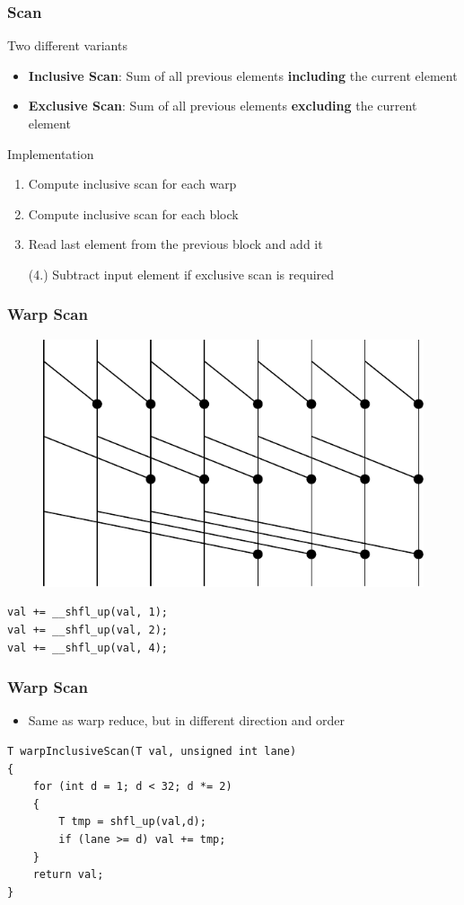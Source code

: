 \documentclass[aspectratio=169,handout]{beamer}
\begin{document}
\begin{frame}[fragile]
\frametitle{Scan}
Two different variants
\begin{itemize}
	\item \textbf{Inclusive Scan}: Sum of all previous elements \textbf{including} the current element
	\item \textbf{Exclusive Scan}: Sum of all previous elements \textbf{excluding} the current element
\end{itemize}
Implementation
\begin{enumerate}
	\item Compute inclusive scan for each warp
	\item Compute inclusive scan for each block
	\item Read last element from the previous block and add it
	\item[(4.)] Subtract input element if exclusive scan is required
\end{enumerate}
\end{frame}

\begin{frame}[fragile]
\frametitle{Warp Scan}
\begin{figure}
	\centering
	\includegraphics[height=0.6\textheight]{warpscan}
\end{figure}
\begin{lstlisting}
val += __shfl_up(val, 1);
val += __shfl_up(val, 2);
val += __shfl_up(val, 4);
\end{lstlisting}
\end{frame}


\begin{frame}[fragile]
\frametitle{Warp Scan}
\begin{itemize}
	\item Same as warp reduce, but in different direction and order
\end{itemize}

\begin{lstlisting}
T warpInclusiveScan(T val, unsigned int lane) 
{
	for (int d = 1; d < 32; d *= 2) 
	{
		T tmp = shfl_up(val,d);
		if (lane >= d) val += tmp;
	}
	return val;
}
\end{lstlisting}

\end{frame}
\end{document}
